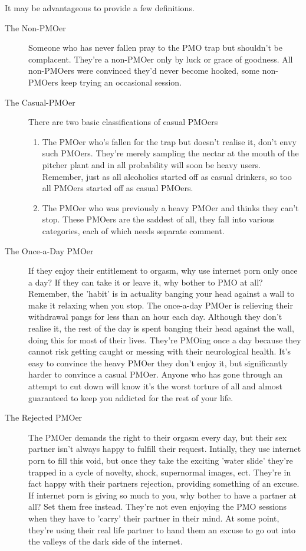 \documentclass[easypeasy]{subfiles}
\begin{document}
It may be advantageous to provide a few definitions.
 \begin{description} 
   \item [The Non-PMOer] Someone who has never fallen pray to the PMO trap but shouldn't be complacent. They're a non-PMOer only by luck or grace of goodness. All non-PMOers were convinced they'd never become hooked, some non-PMOers keep trying an occasional session.

   \item [The Casual-PMOer] There are two basic classifications of casual PMOers
\begin{enumerate}
\item The PMOer who's fallen for the trap but doesn't realise it, don't envy such PMOers. They're merely sampling the nectar at the mouth of the pitcher plant and in all probability will soon be heavy users. Remember, just as all alcoholics started off as casual drinkers, so too all PMOers started off as casual PMOers.

\item The PMOer who was previously a heavy PMOer and thinks they can't stop. These PMOers are the saddest of all, they fall into various categories, each of which needs separate comment.
\end{enumerate}
    \item [The Once-a-Day PMOer] If they enjoy their entitlement to orgasm, why use internet porn only once a day? If they can take it or leave it, why bother to PMO at all? Remember, the 'habit' is in actuality banging your head against a wall to make it relaxing when you stop. The once-a-day PMOer is relieving their withdrawal pangs for less than an hour each day. Although they don't realise it, the rest of the day is spent banging their head against the wall, doing this for most of their lives. They're PMOing once a day because they cannot risk getting caught or messing with their neurological health. It's easy to convince the heavy PMOer they don't enjoy it, but significantly harder to convince a casual PMOer. Anyone who has gone through an attempt to cut down will know it's the worst torture of all and almost guaranteed to keep you addicted for the rest of your life.

    \item [The Rejected PMOer] The PMOer demands the right to their orgasm every day, but their sex partner isn't always happy to fulfill their request. Intially, they use internet porn to fill this void, but once they take the exciting 'water slide' they're trapped in a cycle of novelty, shock, supernormal images, ect. They're in fact happy with their partners rejection, providing something of an excuse. If internet porn is giving so much to you, why bother to have a partner at all? Set them free instead. They're not even enjoying the PMO sessions when they have to 'carry' their partner in their mind. At some point, they're using their real life partner to hand them an excuse to go out into the valleys of the dark side of the internet.


\end{description}
\end{document}
